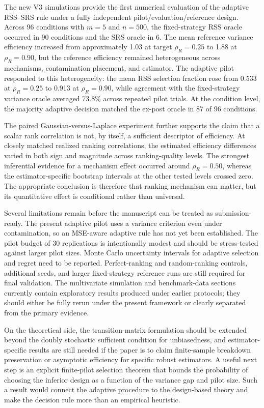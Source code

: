 \documentclass[12pt]{article}
\begin{document}
The new V3 simulations provide the first numerical evaluation of the adaptive RSS--SRS rule under a fully independent pilot/evaluation/reference design. Across 96 conditions with $m=5$ and $n=500$, the fixed-strategy RSS oracle occurred in 90 conditions and the SRS oracle in 6. The mean reference variance efficiency increased from approximately 1.03 at target $\rho_R=0.25$ to 1.88 at $\rho_R=0.90$, but the reference efficiency remained heterogeneous across mechanisms, contamination placement, and estimator. The adaptive pilot responded to this heterogeneity: the mean RSS selection fraction rose from 0.533 at $\rho_R=0.25$ to 0.913 at $\rho_R=0.90$, while agreement with the fixed-strategy variance oracle averaged 73.8\% across repeated pilot trials. At the condition level, the majority adaptive decision matched the ex-post oracle in 87 of 96 conditions.

The paired Gaussian-versus-Laplace experiment further supports the claim that a scalar rank correlation is not, by itself, a sufficient descriptor of efficiency. At closely matched realized ranking correlations, the estimated efficiency differences varied in both sign and magnitude across ranking-quality levels. The strongest inferential evidence for a mechanism effect occurred around $\rho_R=0.50$, whereas the estimator-specific bootstrap intervals at the other tested levels crossed zero. The appropriate conclusion is therefore that ranking mechanism can matter, but its quantitative effect is conditional rather than universal.

Several limitations remain before the manuscript can be treated as submission-ready. The present adaptive pilot uses a variance criterion even under contamination, so an MSE-aware adaptive rule has not yet been established. The pilot budget of 30 replications is intentionally modest and should be stress-tested against larger pilot sizes. Monte Carlo uncertainty intervals for adaptive selection and regret need to be reported. Perfect-ranking and random-ranking controls, additional seeds, and larger fixed-strategy reference runs are still required for final validation. The multivariate simulation and benchmark-data sections currently contain exploratory results produced under earlier protocols; they should either be fully rerun under the present framework or clearly separated from the primary evidence.

On the theoretical side, the transition-matrix formulation should be extended beyond the doubly stochastic sufficient condition for unbiasedness, and estimator-specific results are still needed if the paper is to claim finite-sample breakdown preservation or asymptotic efficiency for specific robust estimators. A useful next step is an explicit finite-pilot selection theorem that bounds the probability of choosing the inferior design as a function of the variance gap and pilot size. Such a result would connect the adaptive procedure to the design-based theory and make the decision rule more than an empirical heuristic.
\end{document}
